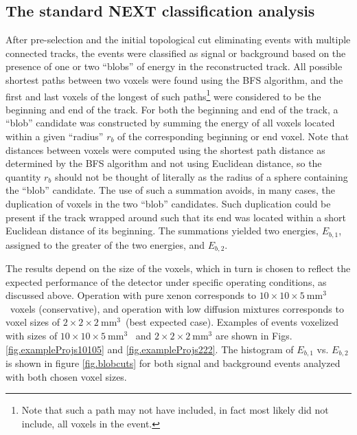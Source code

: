 \documentclass[a4paper,11pt]{article}
\begin{document}
\subsection{The standard NEXT classification analysis}
\label{ssec:ClassificationAnalysis}
After pre-selection and the initial topological cut eliminating events with multiple connected tracks, the events were classified as signal or background based on the presence of one or 
two ``blobs'' of energy in the reconstructed track.  All possible shortest paths between two voxels were found using the BFS algorithm, and the first and last voxels of the longest of such 
paths\footnote{Note that such a path 
may not have included, in fact most likely did not include, all voxels in the event.} were considered to be the beginning and end of the track.  For both the beginning and end of the track, a 
``blob'' candidate was constructed by summing the energy of all voxels located within a given ``radius'' $r_b$ of the corresponding beginning or end voxel.  Note that distances between voxels
were computed using the shortest path distance as determined by the BFS algorithm and not using Euclidean distance, so the quantity $r_b$ should not be thought of literally as the radius of
a sphere containing the ``blob'' candidate.  The use of such a summation avoids, in many cases, the duplication of voxels in the two ``blob'' candidates.  Such duplication could be present if the track wrapped around such 
that its end was located within a short Euclidean distance of its beginning.  The summations yielded two energies, $E_{b,1}$, assigned to the greater of the two energies, and $E_{b,2}$.

The results depend on the size of the voxels, which in turn is chosen to reflect the expected performance of the detector under specific operating conditions, as discussed above. Operation with pure xenon corresponds to $10 \times 10 \times 5 \mathrm{~mm^3}$~voxels (conservative), and operation with low diffusion mixtures corresponds to voxel sizes of $2 \times 2 \times 2 \mathrm{~mm^3}$~(best expected case).  Examples of events voxelized with sizes of $10 \times 10 \times 5 \mathrm{~mm^3}$~ and
$2 \times 2 \times 2 \mathrm{~mm^3}$ are shown in Figs. \ref{fig.exampleProjs10105} and \ref{fig.exampleProjs222}.  The histogram of $E_{b,1}$ vs. $E_{b,2}$ is shown in figure 
\ref{fig.blobcuts} for both signal and background events analyzed with both chosen voxel sizes.
\end{document}
